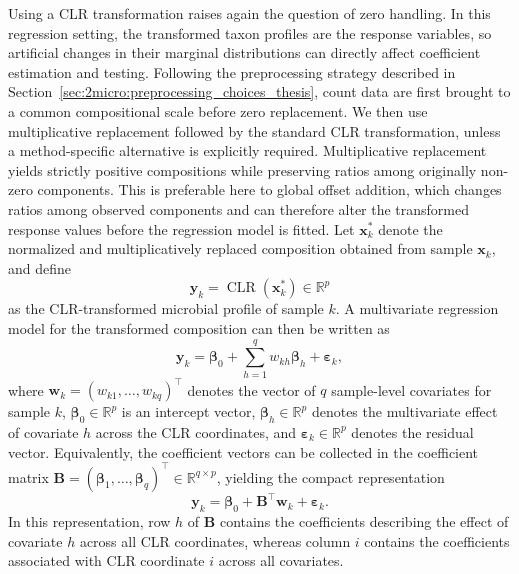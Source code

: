 Using a CLR transformation raises again the question of zero handling. In this regression setting, the transformed taxon profiles are the response variables, so artificial changes in their marginal distributions can directly affect coefficient estimation and testing. Following the preprocessing strategy described in Section~\ref{sec:2micro:preprocessing_choices_thesis}, count data are first brought to a common compositional scale before zero replacement. We then use multiplicative replacement followed by the standard CLR transformation, unless a method-specific alternative is explicitly required. Multiplicative replacement yields strictly positive compositions while preserving ratios among originally non-zero components. This is preferable here to global offset addition, which changes ratios among observed components and can therefore alter the transformed response values before the regression model is fitted. 
Let $\mathbf{x}_k^\ast$ denote the normalized and multiplicatively replaced composition obtained from sample $\mathbf{x}_k$, and define
\begin{equation}
\mathbf{y}_k=\operatorname{CLR}\left(\mathbf{x}_k^\ast\right)\in\mathbb{R}^p
\end{equation}
as the CLR-transformed microbial profile of sample $k$. A multivariate regression model for the transformed composition can then be written as
\begin{equation}
\mathbf{y}_k = \boldsymbol{\beta}_0 + \sum_{h=1}^q w_{kh}\boldsymbol{\beta}_h + \boldsymbol{\varepsilon}_k,
\end{equation}
where $\mathbf{w}_k=(w_{k1},\ldots,w_{kq})^\top$ denotes the vector of $q$ sample-level covariates for sample $k$, $\boldsymbol{\beta}_0\in\mathbb{R}^p$ is an intercept vector, $\boldsymbol{\beta}_h\in\mathbb{R}^p$ denotes the multivariate effect of covariate $h$ across the CLR coordinates, and $\boldsymbol{\varepsilon}_k\in\mathbb{R}^p$ denotes the residual vector. Equivalently, the coefficient vectors can be collected in the coefficient matrix $\mathbf{B}=(\boldsymbol{\beta}_1,\ldots,\boldsymbol{\beta}_q)^\top\in\mathbb{R}^{q\times p}$, yielding the compact representation
\begin{equation}
\mathbf{y}_k = \boldsymbol{\beta}_0 + \mathbf{B}^\top \mathbf{w}_k + \boldsymbol{\varepsilon}_k.
\end{equation}
In this representation, row $h$ of $\mathbf{B}$ contains the coefficients describing the effect of covariate $h$ across all CLR coordinates, whereas column $i$ contains the coefficients associated with CLR coordinate $i$ across all covariates. 

